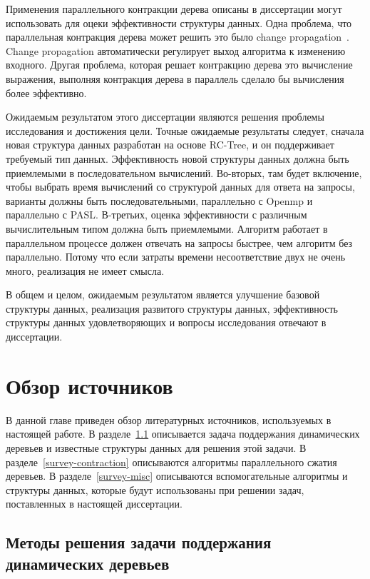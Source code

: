 \documentclass[specification,annotation]{itmo-student-thesis}
\newcommand{\revise}[1]{{\color{red!70!black} #1 }}
\begin{document}
\revise{
Применения параллельного контракции дерева описаны в диссертации могут  использовать для оцеки эффективности 
структуры данных. Одна проблема, что параллельная контракция дерева может решить это было change propagation~\cite{acar05}.
Change propagation автоматически регулирует выход алгоритма к изменению входного. Другая 
проблема, которая решает контракцию дерева это вычисление выражения, выполняя контракция дерева в параллель 
сделало бы вычисления более эффективно.

Ожидаемым результатом этого диссертации являются решения проблемы исследования и достижения цели. Точные 
ожидаемые результаты следует, сначала новая структура данных разработан на основе RC-Tree, и он поддерживает 
требуемый тип данных. Эффективность новой структуры данных должна быть приемлемыми в последовательном 
вычислений. Во-вторых, там будет включение, чтобы выбрать время вычислений со структурой данных для ответа на 
запросы, варианты должны быть последовательными, параллельно с Openmp и параллельно с PASL. В-третьих, оценка 
эффективности с различным вычислительным типом должна быть приемлемыми. Алгоритм работает в параллельном 
процессе должен отвечать на запросы быстрее, чем алгоритм без параллельно. Потому что если затраты времени 
несоответствие двух не очень много, реализация не имеет смысла.

В общем и целом, ожидаемым результатом является улучшение базовой структуры данных, реализация развитого 
структуры данных, эффективность структуры данных удовлетворяющих и вопросы исследования отвечают в 
диссертации.
}

\chapter{Обзор источников}

В данной главе приведен обзор литературных источников, используемых в настоящей работе. 
В разделе~\ref{survey-tree} описывается задача поддержания динамических деревьев и известные структуры данных для решения этой задачи.
В разделе~\ref{survey-contraction} описываются алгоритмы параллельного сжатия деревьев.
В разделе~\ref{survey-misc} описываются вспомогательные алгоритмы и структуры данных, которые будут использованы при решении задач, поставленных в настоящей диссертации.

\section{Методы решения задачи поддержания динамических деревьев}\label{survey-tree}
\end{document}

